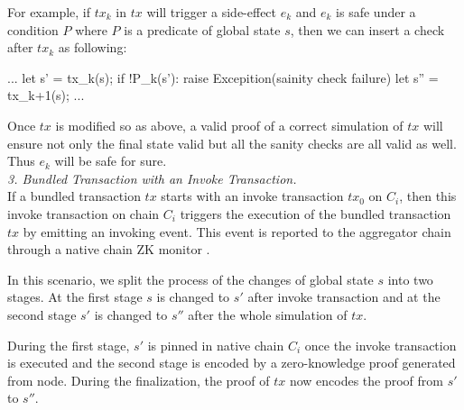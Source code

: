 For example, if $tx_k$ in $tx$ will trigger a side-effect $e_k$ and $e_k$ is safe under a condition $P$ where $P$ is a predicate of global state $s$, then we can insert a check after $tx_k$ as following:

\begin{code}
...
let s' = tx_k(s);
if !P_k(s'):
    raise Excepition(sainity check failure)
let s'' = tx_{k+1}(s);
...
\end{code}
Once $tx$ is modified so as above, a valid proof of a correct simulation of $tx$ will ensure not only the final state valid but all the sanity checks are all valid as well. Thus $e_k$ will be safe for sure.\\

\noindent\smallskip\emph{3. Bundled Transaction with an Invoke Transaction.}\\
If a bundled transaction $tx$ starts with an invoke transaction $tx_0$ on $C_i$, then this invoke transaction on chain $C_i$ triggers the execution of the bundled transaction $tx$ by emitting an invoking event. This event is reported to the aggregator chain through a native chain ZK monitor \cite{garoffolo2020zendoo}.


In this scenario, we split the process of the changes of global state $s$ into two stages. At the first stage $s$ is changed to $s'$ after invoke transaction and at the second stage $s'$ is changed to $s''$ after the whole simulation of $tx$.

During the first stage, $s'$ is pinned in native chain $C_i$ once the invoke transaction is executed and the second stage is encoded by a zero-knowledge proof generated from \dprotocol node. During the finalization, the proof of $tx$ now encodes the proof from $s'$ to $s''$.


